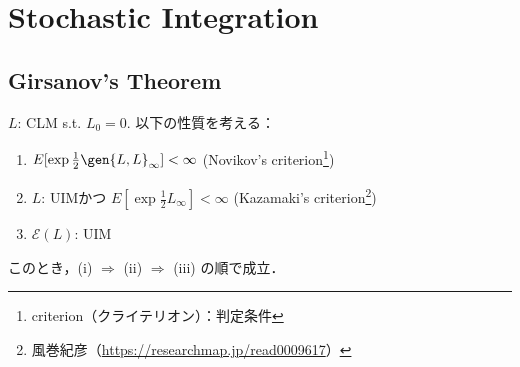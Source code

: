 \documentclass{jsarticle}
\title{}
\author{}
\date{
}
\begin{document}
\setcounter{section}{4}
\section{Stochastic Integration}
\setcounter{subsection}{4}
\subsection{Girsanov's Theorem}

\setcounter{thm}{22}
\begin{shadebox}
    \begin{thm}
    \label{thm:523}
        $L$: CLM s.t. $L_0=0.$
        以下の性質を考える：
        \begin{enumerate}[label=(\roman*)]
            \item
            $E[\exp\frac{1}{2}\gen{L,L}_{\infty}]<\infty$
            (Novikov's criterion\footnote{criterion（クライテリオン）：判定条件})
            \item
            $L$: UIMかつ $E[\exp\frac{1}{2}L_{\infty}]<\infty$
            (Kazamaki's criterion\footnote{風巻紀彦（\url{https://researchmap.jp/read0009617}）})
            \item
            $\mathcal{E}(L)$: UIM
        \end{enumerate}
        このとき，(i) $\Rightarrow$ (ii) $\Rightarrow$ (iii) の順で成立．
    \end{thm}
\end{shadebox}
\end{document}
